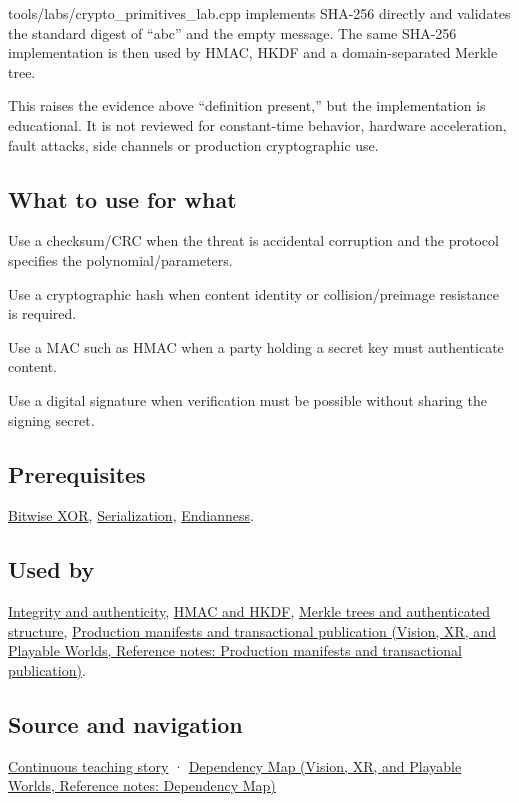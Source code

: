tools/labs/crypto\_primitives\_lab.cpp implements SHA-256 directly and validates the standard digest of ``abc'' and the empty message. The same SHA-256 implementation is then used by HMAC, HKDF and a domain-separated Merkle tree.

This raises the evidence above ``definition present,'' but the implementation is educational. It is not reviewed for constant-time behavior, hardware acceleration, fault attacks, side channels or production cryptographic use.

\subsection{What to use for what}\label{appendix-ed338677de0a-what-to-use-for-what}

Use a checksum/CRC when the threat is accidental corruption and the protocol specifies the polynomial/parameters.

Use a cryptographic hash when content identity or collision/preimage resistance is required.

Use a MAC such as HMAC when a party holding a secret key must authenticate content.

Use a digital signature when verification must be possible without sharing the signing secret.

\subsection{Prerequisites}\label{appendix-ed338677de0a-prerequisites}

\hyperref[appendix-d49161831368]{Bitwise XOR}, \hyperref[appendix-91d09ebed979]{Serialization}, \hyperref[appendix-bc07c3d25b18]{Endianness}.

\subsection{Used by}\label{appendix-ed338677de0a-used-by}

\hyperref[appendix-cbe594d1ab0a]{Integrity and authenticity}, \hyperref[appendix-50af792c9da7]{HMAC and HKDF}, \hyperref[appendix-098192f8d46d]{Merkle trees and authenticated structure}, \href{../07-Vision-XR-and-Playable-Worlds/main.pdf\#nameddest=appendix-91eaa3cbdbc3}{Production manifests and transactional publication (Vision, XR, and Playable Worlds, Reference notes: Production manifests and transactional publication)}.

\subsection{Source and navigation}\label{appendix-ed338677de0a-source-and-navigation}

\hyperref[01-foundations-i-ch002-bytes-become-a-durable-agreement]{Continuous teaching story} · \href{../07-Vision-XR-and-Playable-Worlds/main.pdf\#nameddest=appendix-4ad47bdd269a}{Dependency Map (Vision, XR, and Playable Worlds, Reference notes: Dependency Map)}
